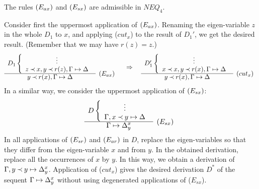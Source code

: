 \begin{LEMMA}\label{le:noEad}\label{le:noEsd} 
The rules $(E_{ax})$ and $(E_{sx})$ are admissible in $NEQ_4$.
\end{LEMMA}
\begin{PROOF}
Consider first the uppermost application of $(E_{ax})$.
Renaming the eigen-variable $z$ in the whole $D_1$ to $x$, and applying ($cut_x$)
to the result of $D_1'$, we get the desired result. (Remember that we may have $r(z)=z$.)
\[ \begin{array}{cl}
D_1 \left \{ \begin{array}{c}
 \vdots \\
 z\Incl x, y\Incl r(z), \Gamma\Seq\Delta \end{array} \right . \\ \cline{1-1}
 y \Incl r(x), \Gamma\Seq\Delta & \rabove{\Eax}
\end{array} 
\conv
\begin{array}{cl}
D_1' \left \{ \begin{array}{c}
 \vdots \\
 x\Incl x, y\Incl r(x), \Gamma\Seq\Delta \end{array} \right . \\ \cline{1-1}
 y \Incl r(x), \Gamma\Seq\Delta & \raisebox{1.2ex}[1.5ex][0ex]{$(cut_x)$}
\end{array} \]
In a similar way, we consider the uppermost application of $(E_{sx})$:
\[ \begin{array}{cl}
D\left\{ \begin{array}{c}
 \vdots \\
 \Gamma,x\Incl y\Seq\Delta \end{array} \right. \\ \cline{1-1}
 \Gamma\Seq\Delta_y^x  &  \raisebox{1.2ex}[1.5ex][0ex]{($E_{sx}$)}
\end{array} \]
In all applications of $(E_{sr})$ and $(E_{ar})$ in $D$, replace the
eigen-variables so that they differ from the eigen-variable $x$ and from $y$. 
In the obtained
derivation, replace all the occurrences of $x$ by $y$. In this way, we 
obtain a derivation of $\Gamma,y\mathbin{\prec} y\mathrel{\mapsto}\Delta_y^x$. 
Application of ($cut_x$) gives the desired derivation $D^*$ of the
sequent $\Gamma\mathrel{\mapsto}\Delta_y^x$ 
without using degenerated applications of ($E_{sx}$).
\end{PROOF}
%
